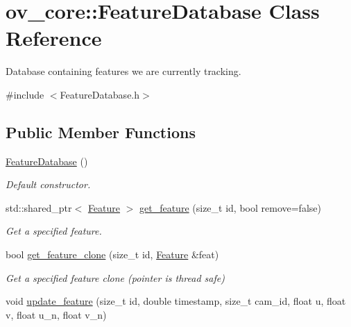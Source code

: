 \hypertarget{classov__core_1_1FeatureDatabase}{}\section{ov\+\_\+core\+:\+:Feature\+Database Class Reference}
\label{classov__core_1_1FeatureDatabase}


Database containing features we are currently tracking.  




{\ttfamily \#include $<$Feature\+Database.\+h$>$}

\subsection*{Public Member Functions}
\begin{DoxyCompactItemize}
\item 
\mbox{\label{classov__core_1_1FeatureDatabase_a26d81dfa410ec463172796cc9ae8cafd}} 
\hyperlink{classov__core_1_1FeatureDatabase_a26d81dfa410ec463172796cc9ae8cafd}{Feature\+Database} ()
\begin{DoxyCompactList}\small\item\em Default constructor. \end{DoxyCompactList}\item 
std\+::shared\+\_\+ptr$<$ \hyperlink{classov__core_1_1Feature}{Feature} $>$ \hyperlink{classov__core_1_1FeatureDatabase_a3c7b5ef425c785eb3c160e995c545f87}{get\+\_\+feature} (size\+\_\+t id, bool remove=false)
\begin{DoxyCompactList}\small\item\em Get a specified feature. \end{DoxyCompactList}\item 
bool \hyperlink{classov__core_1_1FeatureDatabase_a98e2d5320881107343b07f79cac8b541}{get\+\_\+feature\+\_\+clone} (size\+\_\+t id, \hyperlink{classov__core_1_1Feature}{Feature} \&feat)
\begin{DoxyCompactList}\small\item\em Get a specified feature clone (pointer is thread safe) \end{DoxyCompactList}\item 
void \hyperlink{classov__core_1_1FeatureDatabase_adf78008573a5aebe8a89cddbaf4b5b01}{update\+\_\+feature} (size\+\_\+t id, double timestamp, size\+\_\+t cam\+\_\+id, float u, float v, float u\+\_\+n, float v\+\_\+n)

\end{DoxyCompactItemize}
